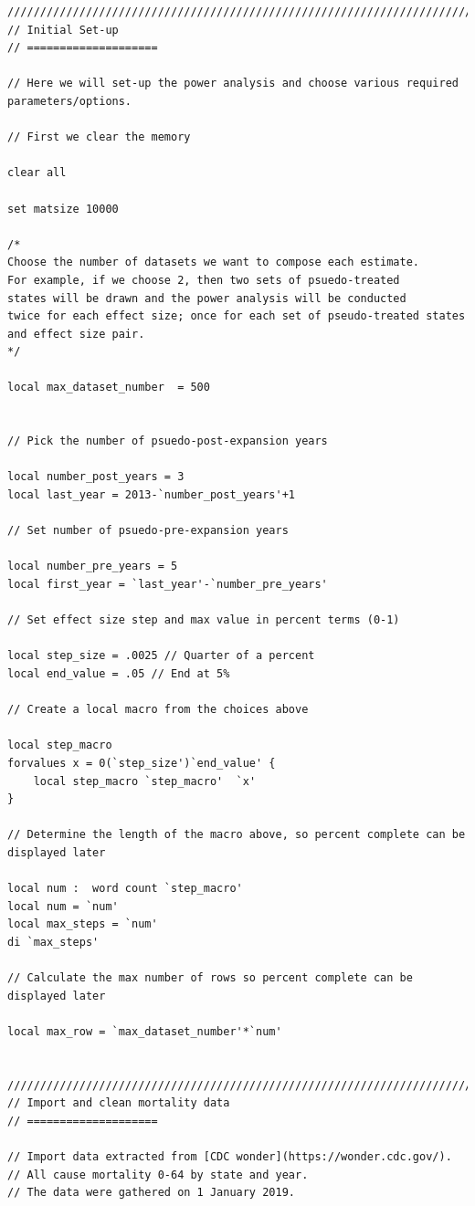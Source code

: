 \documentclass[12pt]{article}%
\begin{document}
\begin{appendices}
\begin{footnotesize}
\begin{verbatim}
////////////////////////////////////////////////////////////////////////////////
// Initial Set-up
// ====================

// Here we will set-up the power analysis and choose various required parameters/options.

// First we clear the memory

clear all

set matsize 10000

/* 
Choose the number of datasets we want to compose each estimate. 
For example, if we choose 2, then two sets of psuedo-treated 
states will be drawn and the power analysis will be conducted 
twice for each effect size; once for each set of pseudo-treated states and effect size pair. 
*/

local max_dataset_number  = 500


// Pick the number of psuedo-post-expansion years

local number_post_years = 3
local last_year = 2013-`number_post_years'+1

// Set number of psuedo-pre-expansion years

local number_pre_years = 5
local first_year = `last_year'-`number_pre_years'

// Set effect size step and max value in percent terms (0-1)

local step_size = .0025 // Quarter of a percent
local end_value = .05 // End at 5%

// Create a local macro from the choices above

local step_macro 
forvalues x = 0(`step_size')`end_value' {
    local step_macro `step_macro'  `x'
}

// Determine the length of the macro above, so percent complete can be displayed later

local num :  word count `step_macro'
local num = `num'
local max_steps = `num'
di `max_steps'
        
// Calculate the max number of rows so percent complete can be displayed later

local max_row = `max_dataset_number'*`num'


////////////////////////////////////////////////////////////////////////////////
// Import and clean mortality data
// ====================
            
// Import data extracted from [CDC wonder](https://wonder.cdc.gov/). 
// All cause mortality 0-64 by state and year. 
// The data were gathered on 1 January 2019. 


\end{verbatim}
\end{footnotesize}
\end{appendices}
\end{document}
